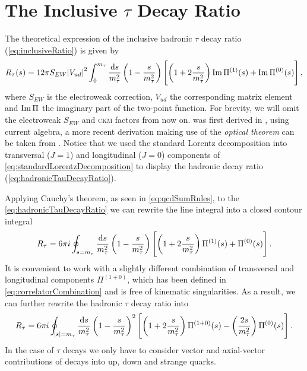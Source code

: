 \documentclass[../../index.tex]{subfiles}
\begin{document}
\section{The Inclusive \(\tau\) Decay Ratio}
The theoretical expression of the inclusive hadronic \(\tau\) decay ratio
(\cref{eq:inclusiveRatio}) is given by
\begin{equation}
  \label{eq:hadronicTauDecayRatio}
  R_\tau(s) = 12 \pi S_{EW} \abs{V_{ud}}^2 \int_0^{m_\tau} \frac{\dif s}{m_\tau^2}
  \left( 1 - \frac{s}{m_\tau^2} \right)
  \left[ \left( 1 + 2 \frac{s}{m_\tau^2} \right) \Ima \Pi^{(1)}(s) + \Ima \Pi^{(0)}(s) \right],
\end{equation}
where \(S_{EW}\) is the electroweak correction, \(V_{ud}\) the corresponding
 matrix element and $\operatorname{Im} \Pi$ the
imaginary part of the two-point function. For brevity, we will omit the
electroweak \(S_{EW}\) and \textsc{ckm} factors from now on.
 was first derived in \cite{Tsai1971}, using
current algebra, a more recent derivation making use of the \textit{optical
  theorem} can be taken from \cite{Schwab2002}. Notice that we used the standard
Lorentz decomposition into transversal (\(J=1\)) and longitudinal (\(J=0\))
components of \cref{eq:standardLorentzDecomposition} to display the hadronic
decay ratio (\cref{eq:hadronicTauDecayRatio}).

Applying Cauchy's theorem, as seen in \cref{eq:qcdSumRules}, to the
\cref{eq:hadronicTauDecayRatio} we can rewrite the line integral into a closed
contour integral
\begin{equation}
  \label{eq:rTauT+L}
  R_\tau = 6 \pi i \oint_{s=m_\tau} \frac{\dif s}{m_\tau^2}
  \left( 1 - \frac{s}{m_\tau^2} \right)
  \left[ \left( 1 + 2 \frac{s}{m_\tau^2} \right) \Pi^{(1)}(s) + \Pi^{(0)}(s) \right].
\end{equation}
It is convenient to work with a slightly different combination of transversal
and longitudinal components \(\Pi^{(1+0)}\), which has been defined in
\cref{eq:correlatorCombination} and is free of kinematic singularities. As a
result, we can further rewrite the hadronic \(\tau\) decay ratio into
\begin{equation}
  \label{eq:tauDecayRatioTL}
  R_\tau = 6 \pi i \oint_{\abs{s}=m_\tau} \frac{\dif s}{m_\tau^2}
  \left( 1 - \frac{s}{m_\tau^2} \right)^2
  \left[ \left( 1 + 2 \frac{s}{m_\tau^2} \right) \Pi^{(1+0)}(s) - \left( \frac{2 s}{m_\tau^2} \right) \Pi^{(0)}(s) \right].
\end{equation}
In the case of \(\tau\) decays we only have to consider vector and axial-vector
contributions of decays into up, down and strange quarks.
\end{document}
